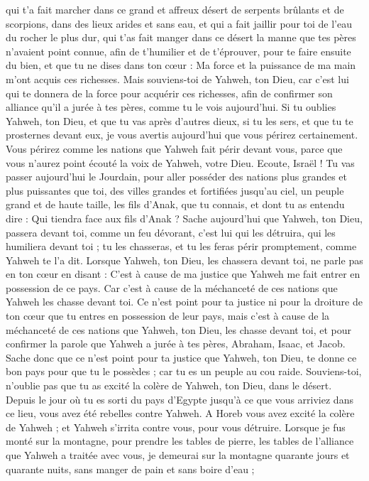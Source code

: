 \begin{multicols}{2}
qui t'a fait marcher dans ce grand et affreux désert de serpents brûlants et de scorpions, dans des lieux arides et sans eau, et qui a fait jaillir pour toi de l'eau du rocher le plus dur,
qui t’as fait manger dans ce désert la manne que tes pères n'avaient point connue, afin de t'humilier et de t'éprouver, pour te faire ensuite du bien,
et que tu ne dises dans ton cœur : Ma force et la puissance de ma main m'ont acquis ces richesses.
Mais souviens-toi de Yahweh, ton Dieu, car c'est lui qui te donnera de la force pour acquérir ces richesses, afin de confirmer son alliance qu'il a jurée à tes pères, comme tu le vois aujourd’hui.
Si tu oublies Yahweh, ton Dieu, et que tu vas après d’autres dieux, si tu les sers, et que tu te prosternes devant eux, je vous avertis aujourd’hui que vous périrez certainement.
Vous périrez comme les nations que Yahweh fait périr devant vous, parce que vous n'aurez point écouté la voix de Yahweh, votre Dieu.
\VerseOne{}Ecoute, Israël ! Tu vas passer aujourd'hui le Jourdain, pour aller posséder des nations plus grandes et plus puissantes que toi, des villes grandes et fortifiées jusqu'au ciel,
un peuple grand et de haute taille, les fils d’Anak, que tu connais, et dont tu as entendu dire : Qui tiendra face aux fils d’Anak ?
Sache aujourd'hui que Yahweh, ton Dieu, passera devant toi, comme un feu dévorant, c'est lui qui les détruira, qui les humiliera devant toi ; tu les chasseras, et tu les feras périr promptement, comme Yahweh te l'a dit.
Lorsque Yahweh, ton Dieu, les chassera devant toi, ne parle pas en ton cœur en disant : C'est à cause de ma justice que Yahweh me fait entrer en possession de ce pays. Car c'est à cause de la méchanceté de ces nations que Yahweh les chasse devant toi.
Ce n'est point pour ta justice ni pour la droiture de ton cœur que tu entres en possession de leur pays, mais c'est à cause de la méchanceté de ces nations que Yahweh, ton Dieu, les chasse devant toi, et pour confirmer la parole que Yahweh a jurée à tes pères, Abraham, Isaac, et Jacob.
Sache donc que ce n'est point pour ta justice que Yahweh, ton Dieu, te donne ce bon pays pour que tu le possèdes ; car tu es un peuple au cou raide.
Souviens-toi, n'oublie pas que tu as excité la colère de Yahweh, ton Dieu, dans le désert. Depuis le jour où tu es sorti du pays d'Egypte jusqu'à ce que vous arriviez dans ce lieu, vous avez été rebelles contre Yahweh.
A Horeb vous avez excité la colère de Yahweh ; et Yahweh s’irrita contre vous, pour vous détruire.
Lorsque je fus monté sur la montagne, pour prendre les tables de pierre, les tables de l'alliance que Yahweh a traitée avec vous, je demeurai sur la montagne quarante jours et quarante nuits, sans manger de pain et sans boire d'eau ;

\end{multicols}
